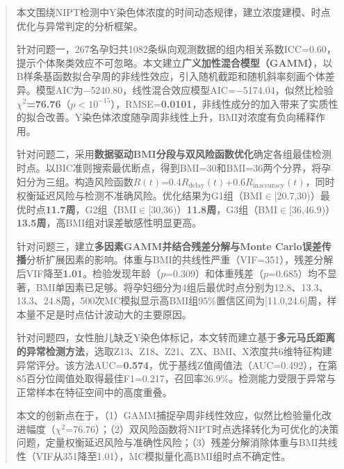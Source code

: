 \begin{abstract}

本文围绕NIPT检测中Y染色体浓度的时间动态规律，建立浓度建模、时点优化与异常判定的分析框架。

针对问题一，267名孕妇共1082条纵向观测数据的组内相关系数ICC=0.60，提示个体聚类效应不可忽略。本文建立\textbf{广义加性混合模型（GAMM）}，以B样条基函数拟合孕周的非线性效应，引入随机截距和随机斜率刻画个体差异。模型AIC为$-$5240.80，线性混合效应模型AIC=$-$5174.04，似然比检验\textbf{$\chi^2$=76.76}（$p<10^{-15}$），RMSE=\textbf{0.0101}，非线性成分的加入带来了实质性的拟合改善。Y染色体浓度随孕周非线性上升，BMI对浓度有负向稀释作用。

针对问题二，采用\textbf{数据驱动BMI分段与双风险函数优化}确定各组最佳检测时点。以BIC准则搜索最优断点，得到BMI=30和BMI=36两个分界，将孕妇分为三组。构造风险函数$R(t)$=0.4$R_{\text{delay}}(t)$+0.6$R_{\text{inaccuracy}}(t)$，同时权衡延迟风险与检测不准确风险。优化结果为G1组（BMI$\in$[20.7,30)）最优时点\textbf{11.7周}，G2组（BMI$\in$[30,36)）\textbf{11.8周}，G3组（BMI$\in$[36,46.9)）\textbf{13.5周}，高BMI组对误差敏感性明显更高。

针对问题三，建立\textbf{多因素GAMM并结合残差分解与Monte Carlo误差传播}分析扩展因素的影响。体重与BMI的共线性严重（VIF=351），残差分解后VIF降至\textbf{1.01}。检验发现年龄（$p$=0.309）和体重残差（$p$=0.685）均不显著，BMI单因素已足够。将孕妇细分为4组后最优时点分别为12.8、13.3、13.3、24.8周，500次MC模拟显示高BMI组95\%置信区间为[11.0,24.6]周，样本量不足是时点估计波动大的主要原因。

针对问题四，女性胎儿缺乏Y染色体标记，本文转而建立基于\textbf{多元马氏距离的异常检测方法}，选取Z13、Z18、Z21、ZX、BMI、X浓度共6维特征构建异常评分。该方法AUC=\textbf{0.574}，优于基线Z值阈值法（AUC=0.492），在第85百分位阈值处取得最佳F1=0.217，召回率26.9\%。检测能力受限于异常与正常样本在特征空间中的高度重叠。

本文的创新点在于，（1）GAMM捕捉孕周非线性效应，似然比检验量化改进幅度（$\chi^2$=76.76）；（2）双风险函数将NIPT时点选择转化为可优化的决策问题，定量权衡延迟风险与准确性风险；（3）残差分解消除体重与BMI共线性（VIF从351降至1.01），MC模拟量化高BMI组时点不确定性。

\end{abstract}

